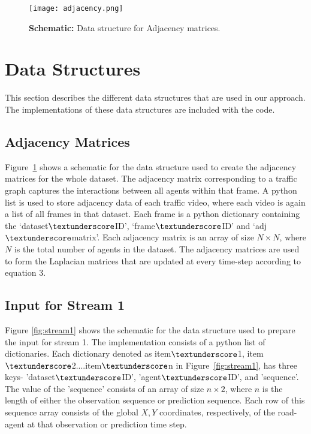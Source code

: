 \documentclass[10pt,twocolumn,letterpaper]{article}
\theoremstyle{plain}
\begin{document}
%
 

\begin{figure}[t]
\texttt{[image: adjacency.png]}
    \caption{\textbf{Schematic:} Data structure for Adjacency matrices.}
\label{fig:adjacency}
\end{figure}
\section{Data Structures}
\label{sec: dat_structures}
This section describes the different data structures that are used in our approach. The implementations of these data structures are included with the code. 

\subsection{Adjacency Matrices}
Figure~\ref{fig:adjacency} shows a schematic for the data structure used to create the adjacency matrices for the whole dataset. The adjacency matrix corresponding to a traffic graph captures the interactions between all agents within that frame. A python list is used to store adjacency data of each traffic video, where each video is again a list of all frames in that dataset. Each frame is a python dictionary containing the `dataset$\textunderscore$ID', `frame$\textunderscore$ID' and `adj$\textunderscore$matrix'. Each adjacency matrix is an array of size $ N \times N$, where $N$ is the total number of agents in the dataset. The adjacency matrices are used to form the Laplacian matrices that are updated at every time-step according to equation $3$.

\subsection{Input for Stream 1}
Figure \ref{fig:stream1} shows the schematic for the data structure used to prepare the input for stream 1. The implementation consists of a python list of dictionaries. Each dictionary denoted as item$\textunderscore$1, item$\textunderscore$2....item$\textunderscore$n in Figure~\ref{fig:stream1}, has three keys- 'dataset$\textunderscore$ID', 'agent$\textunderscore$ID', and 'sequence'. The value of the 'sequence' consists of an array of size $n \times 2$, where $n$ is the length of either the observation sequence or prediction sequence. Each row of this sequence array consists of the global $X,Y$ coordinates, respectively, of the road-agent at that observation or prediction time step.  
\end{document}
